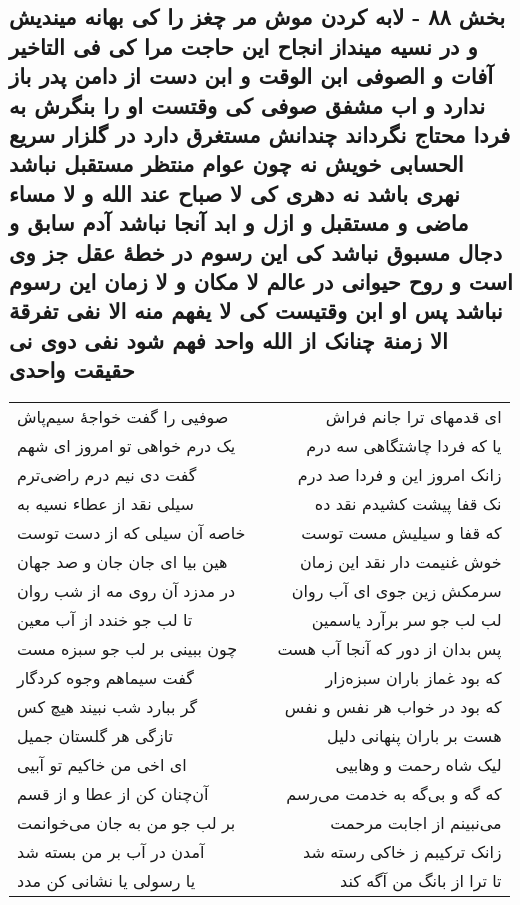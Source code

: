 \begin{center}
\section*{بخش ۸۸ - لابه کردن موش مر چغز را کی بهانه میندیش و در نسیه مینداز انجاح این حاجت مرا کی فی التاخیر آفات و الصوفی ابن الوقت و ابن دست از دامن پدر باز ندارد و اب مشفق صوفی کی وقتست او را بنگرش به فردا محتاج نگرداند چندانش مستغرق دارد در گلزار سریع الحسابی خویش نه چون عوام منتظر مستقبل نباشد نهری باشد نه دهری کی لا صباح عند الله و لا مساء ماضی و مستقبل و ازل و ابد آنجا نباشد آدم سابق و دجال مسبوق نباشد کی این رسوم در خطهٔ عقل جز وی است و روح حیوانی در عالم لا مکان و لا زمان این رسوم نباشد پس او ابن وقتیست کی لا یفهم منه الا نفی تفرقة الا زمنة چنانک از الله واحد فهم شود نفی دوی نی حقیقت واحدی}
\label{sec:sh088}
\begin{longtable}{l p{0.5cm} r}
صوفیی را گفت خواجهٔ سیم‌پاش
&&
ای قدمهای ترا جانم فراش
\\
یک درم خواهی تو امروز ای شهم
&&
یا که فردا چاشتگاهی سه درم
\\
گفت دی نیم درم راضی‌ترم
&&
زانک امروز این و فردا صد درم
\\
سیلی نقد از عطاء نسیه به
&&
نک قفا پیشت کشیدم نقد ده
\\
خاصه آن سیلی که از دست توست
&&
که قفا و سیلیش مست توست
\\
هین بیا ای جان جان و صد جهان
&&
خوش غنیمت دار نقد این زمان
\\
در مدزد آن روی مه از شب روان
&&
سرمکش زین جوی ای آب روان
\\
تا لب جو خندد از آب معین
&&
لب لب جو سر برآرد یاسمین
\\
چون ببینی بر لب جو سبزه مست
&&
پس بدان از دور که آنجا آب هست
\\
گفت سیماهم وجوه کردگار
&&
که بود غماز باران سبزه‌زار
\\
گر ببارد شب نبیند هیچ کس
&&
که بود در خواب هر نفس و نفس
\\
تازگی هر گلستان جمیل
&&
هست بر باران پنهانی دلیل
\\
ای اخی من خاکیم تو آبیی
&&
لیک شاه رحمت و وهابیی
\\
آن‌چنان کن از عطا و از قسم
&&
که گه و بی‌گه به خدمت می‌رسم
\\
بر لب جو من به جان می‌خوانمت
&&
می‌نبینم از اجابت مرحمت
\\
آمدن در آب بر من بسته شد
&&
زانک ترکیبم ز خاکی رسته شد
\\
یا رسولی یا نشانی کن مدد
&&
تا ترا از بانگ من آگه کند
\\

\end{longtable}
\end{center}
